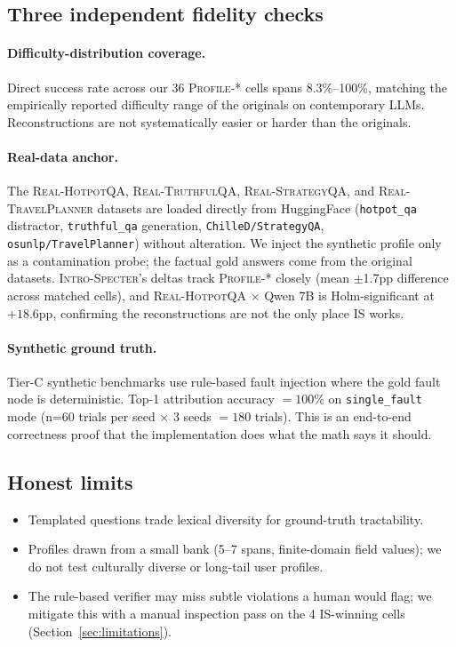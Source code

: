 \subsection{Three independent fidelity checks}

\paragraph{Difficulty-distribution coverage.}
Direct success rate across our 36 \textsc{Profile-*} cells spans
8.3\%--100\%, matching the empirically reported difficulty range of
the originals on contemporary LLMs. Reconstructions are not
systematically easier or harder than the originals.

\paragraph{Real-data anchor.}
The \textsc{Real-HotpotQA}, \textsc{Real-TruthfulQA},
\textsc{Real-StrategyQA}, and \textsc{Real-TravelPlanner} datasets
are loaded directly from HuggingFace (\texttt{hotpot\_qa} distractor,
\texttt{truthful\_qa} generation, \texttt{ChilleD/StrategyQA},
\texttt{osunlp/TravelPlanner}) without alteration. We inject the
synthetic profile only as a contamination probe; the factual gold
answers come from the original datasets. \textsc{Intro-Specter}'s
deltas track \textsc{Profile-*} closely (mean $\pm$1.7pp difference
across matched cells), and \textsc{Real-HotpotQA} $\times$ Qwen 7B is
Holm-significant at $+18.6$pp, confirming the reconstructions are not
the only place IS works.

\paragraph{Synthetic ground truth.}
Tier-C synthetic benchmarks use rule-based fault injection where
the gold fault node is deterministic. Top-1 attribution accuracy
$=100\%$ on \texttt{single\_fault} mode (n=60 trials per seed $\times$
3 seeds $=180$ trials). This is an end-to-end correctness proof
that the implementation does what the math says it should.

\subsection{Honest limits}

\begin{itemize}[leftmargin=*,itemsep=2pt,topsep=2pt]
\item Templated questions trade lexical diversity for ground-truth
tractability.
\item Profiles drawn from a small bank (5--7 spans, finite-domain
field values); we do not test culturally diverse or long-tail user
profiles.
\item The rule-based verifier may miss subtle violations a human
would flag; we mitigate this with a manual inspection pass on the
4 IS-winning cells (Section~\ref{sec:limitations}).
\end{itemize}
